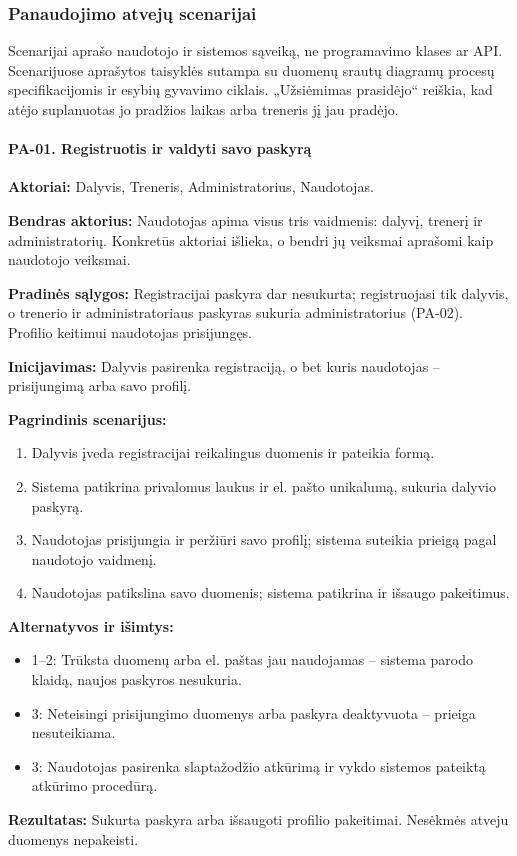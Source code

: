 \subsubsection{Panaudojimo atvejų scenarijai}
Scenarijai aprašo naudotojo ir sistemos sąveiką, ne programavimo klases ar API. Scenarijuose aprašytos taisyklės sutampa su duomenų srautų diagramų procesų specifikacijomis ir esybių gyvavimo ciklais. „Užsiėmimas prasidėjo“ reiškia, kad atėjo suplanuotas jo pradžios laikas arba treneris jį jau pradėjo.
\paragraph{PA-01. Registruotis ir valdyti savo paskyrą}\mbox{}\par
\textbf{Aktoriai:} Dalyvis, Treneris, Administratorius, Naudotojas.\par
\textbf{Bendras aktorius:} Naudotojas apima visus tris vaidmenis: dalyvį, trenerį ir administratorių. Konkretūs aktoriai išlieka, o bendri jų veiksmai aprašomi kaip naudotojo veiksmai.\par
\textbf{Pradinės sąlygos:} Registracijai paskyra dar nesukurta; registruojasi tik dalyvis, o trenerio ir administratoriaus paskyras sukuria administratorius (PA-02). Profilio keitimui naudotojas prisijungęs.\par
\textbf{Inicijavimas:} Dalyvis pasirenka registraciją, o bet kuris naudotojas -- prisijungimą arba savo profilį.\par
\textbf{Pagrindinis scenarijus:}
\begin{enumerate}
\item Dalyvis įveda registracijai reikalingus duomenis ir pateikia formą.
\item Sistema patikrina privalomus laukus ir el. pašto unikalumą, sukuria dalyvio paskyrą.
\item Naudotojas prisijungia ir peržiūri savo profilį; sistema suteikia prieigą pagal naudotojo vaidmenį.
\item Naudotojas patikslina savo duomenis; sistema patikrina ir išsaugo pakeitimus.
\end{enumerate}
\textbf{Alternatyvos ir išimtys:}
\begin{itemize}
\item 1--2: Trūksta duomenų arba el. paštas jau naudojamas -- sistema parodo klaidą, naujos paskyros nesukuria.
\item 3: Neteisingi prisijungimo duomenys arba paskyra deaktyvuota -- prieiga nesuteikiama.
\item 3: Naudotojas pasirenka slaptažodžio atkūrimą ir vykdo sistemos pateiktą atkūrimo procedūrą.
\end{itemize}
\textbf{Rezultatas:} Sukurta paskyra arba išsaugoti profilio pakeitimai. Nesėkmės atveju duomenys nepakeisti.\par
{}
